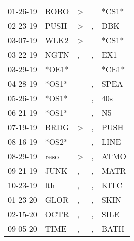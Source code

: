 \begin{supertabular}{p{0.07\textwidth}p{0.06\textwidth}p{0.02\textwidth}p{0.02\textwidth}p{0.06\textwidth}}
 01-26-19\textsuperscript{} &           ROBO\textsuperscript{} &  \textgreater &               &                   *CS1* \\
 02-23-19\textsuperscript{} &           PUSH\textsuperscript{} &  \textgreater &             , &   DBK\textsuperscript{} \\
 03-07-19\textsuperscript{} &           WLK2\textsuperscript{} &  \textgreater &               &                   *CS1* \\
 03-22-19\textsuperscript{} &           NGTN\textsuperscript{} &             , &             , &   EX1\textsuperscript{} \\
 03-29-19\textsuperscript{} &                            *OE1* &               &               &                   *CE1* \\
 04-28-19\textsuperscript{} &                            *OS1* &               &             , &  SPEA\textsuperscript{} \\
 05-26-19\textsuperscript{} &                            *OS1* &               &             , &   40s\textsuperscript{} \\
 06-21-19\textsuperscript{} &                            *OS1* &               &             , &    N5\textsuperscript{} \\
 07-19-19\textsuperscript{} &           BRDG\textsuperscript{} &  \textgreater &             , &  PUSH\textsuperscript{} \\
 08-16-19\textsuperscript{} &                            *OS2* &               &             , &  LINE\textsuperscript{} \\
 08-29-19\textsuperscript{} &           reso\textsuperscript{} &  \textgreater &             , &  ATMO\textsuperscript{} \\
 09-21-19\textsuperscript{} &           JUNK\textsuperscript{} &             , &             , &  MATR\textsuperscript{} \\
 10-23-19\textsuperscript{} &            lth\textsuperscript{} &             , &             , &  KITC\textsuperscript{} \\
 01-23-20\textsuperscript{} &           GLOR\textsuperscript{} &             , &             , &  SKIN\textsuperscript{} \\
 02-15-20\textsuperscript{} &           OCTR\textsuperscript{} &             , &             , &  SILE\textsuperscript{} \\
 09-05-20\textsuperscript{} &           TIME\textsuperscript{} &             , &             , &  BATH\textsuperscript{} \\
\end{supertabular}
